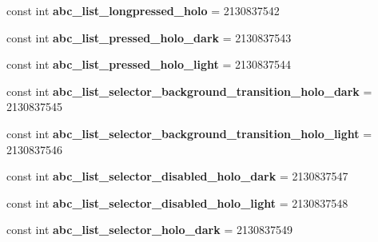 \begin{DoxyCompactItemize}
\item 
\hypertarget{classClient_1_1Droid_1_1Resource_1_1Drawable_a96939ce21bddfbc0d1fc7d885fe722ed}{}const int {\bfseries abc\+\_\+list\+\_\+longpressed\+\_\+holo} = 2130837542\label{classClient_1_1Droid_1_1Resource_1_1Drawable_a96939ce21bddfbc0d1fc7d885fe722ed}

\item 
\hypertarget{classClient_1_1Droid_1_1Resource_1_1Drawable_a0e1562b29e178233ce4ab06e89194a53}{}const int {\bfseries abc\+\_\+list\+\_\+pressed\+\_\+holo\+\_\+dark} = 2130837543\label{classClient_1_1Droid_1_1Resource_1_1Drawable_a0e1562b29e178233ce4ab06e89194a53}

\item 
\hypertarget{classClient_1_1Droid_1_1Resource_1_1Drawable_a22ab2ed58426afa52e2ff08fcc431871}{}const int {\bfseries abc\+\_\+list\+\_\+pressed\+\_\+holo\+\_\+light} = 2130837544\label{classClient_1_1Droid_1_1Resource_1_1Drawable_a22ab2ed58426afa52e2ff08fcc431871}

\item 
\hypertarget{classClient_1_1Droid_1_1Resource_1_1Drawable_a95658099f5d1aaf0a50bf98ad6a16e0f}{}const int {\bfseries abc\+\_\+list\+\_\+selector\+\_\+background\+\_\+transition\+\_\+holo\+\_\+dark} = 2130837545\label{classClient_1_1Droid_1_1Resource_1_1Drawable_a95658099f5d1aaf0a50bf98ad6a16e0f}

\item 
\hypertarget{classClient_1_1Droid_1_1Resource_1_1Drawable_ae8d3873d11a2cebffd46589199845616}{}const int {\bfseries abc\+\_\+list\+\_\+selector\+\_\+background\+\_\+transition\+\_\+holo\+\_\+light} = 2130837546\label{classClient_1_1Droid_1_1Resource_1_1Drawable_ae8d3873d11a2cebffd46589199845616}

\item 
\hypertarget{classClient_1_1Droid_1_1Resource_1_1Drawable_a2de2a5f0aeb117e7aa7c57daa725188b}{}const int {\bfseries abc\+\_\+list\+\_\+selector\+\_\+disabled\+\_\+holo\+\_\+dark} = 2130837547\label{classClient_1_1Droid_1_1Resource_1_1Drawable_a2de2a5f0aeb117e7aa7c57daa725188b}

\item 
\hypertarget{classClient_1_1Droid_1_1Resource_1_1Drawable_ab438f77258e552511edbb761b3c2d6b9}{}const int {\bfseries abc\+\_\+list\+\_\+selector\+\_\+disabled\+\_\+holo\+\_\+light} = 2130837548\label{classClient_1_1Droid_1_1Resource_1_1Drawable_ab438f77258e552511edbb761b3c2d6b9}

\item 
\hypertarget{classClient_1_1Droid_1_1Resource_1_1Drawable_a4cae33ba9e04601b76559017bc2782e2}{}const int {\bfseries abc\+\_\+list\+\_\+selector\+\_\+holo\+\_\+dark} = 2130837549\label{classClient_1_1Droid_1_1Resource_1_1Drawable_a4cae33ba9e04601b76559017bc2782e2}


\end{DoxyCompactItemize}
